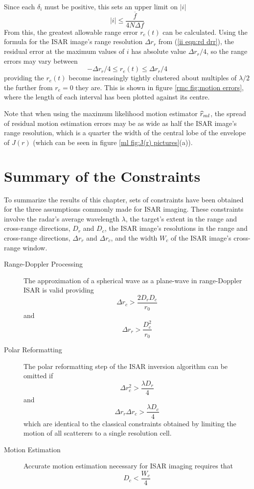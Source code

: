 Since each $\delta_i$ must be positive, this sets an upper limit on
$\left|i\right|$
\begin{equation}
\left|i\right|\leq\frac{\overline{f}}{4N\Delta f}
\end{equation}
From this, the greatest allowable range error $r_e(t)$ can be calculated.
Using the formula for the ISAR image's range resolution $\Delta r_r$ from
(\ref{ii eqn:rd drr}), the residual error at the maximum values of $i$ has 
absolute value $\Delta r_r/4$, so the range errors may vary between
\begin{equation}
-\Delta r_r/4 \leq r_e(t) \leq \Delta r_r/4
\end{equation}
providing the $r_e(t)$ become increasingly tightly clustered about multiples
of $\lambda/2$ the further from $r_e=0$ they are.  This is shown in figure
\ref{rmc fig:motion errors}, where the length of each interval has been 
plotted against its centre.

Note that when using the maximum likelihood motion estimator $\widehat{r}_{ml}$, 
the spread of residual motion estimation errors may be as wide as half the ISAR
image's range resolution, which is a quarter the width
of the central lobe of the envelope of $J(r)$ (which can be seen in
figure \ref{ml fig:J(r) pictures}(a)).

\section{Summary of the Constraints}

To summarize the results of this chapter, sets of constraints have
been obtained for the three assumptions commonly made for ISAR imaging.
These constraints involve the radar's average wavelength $\lambda$, the
target's extent in the range and cross-range directions, $D_r$ and $D_c$,
the ISAR image's resolutions in the range and cross-range directions,
$\Delta r_r$ and $\Delta r_c$, and the width $W_c$ of the ISAR image's
cross-range window.

\begin{description}
\item[Range-Doppler Processing]  The approximation of a spherical wave as
a plane-wave in range-Doppler ISAR is valid providing
$$\Delta r_c>\frac{2D_rD_c}{r_0} $$
and
$$\Delta r_r>\frac{D_c^2}{r_0}	$$

\item[Polar Reformatting]  The polar reformatting step of the ISAR inversion
algorithm can be omitted if
$$\Delta r_c^2>\frac{\lambda D_r}{4}	   $$
and
$$\Delta r_r\Delta r_c>\frac{\lambda D_c}{4}  $$
which are identical to the classical constraints obtained by
limiting the motion of all scatterers to a single resolution cell.

\item[Motion Estimation]  Accurate motion estimation necessary for ISAR 
imaging requires that 
$$D_c<\frac{W_c}{4}$$
\end{description}

